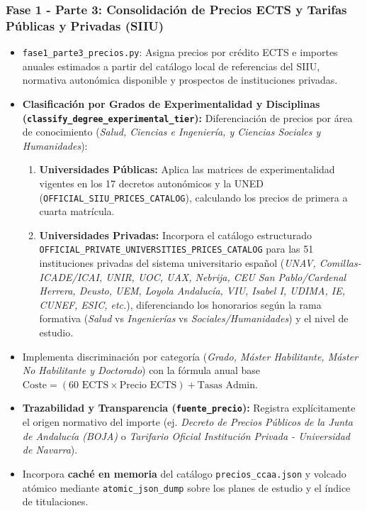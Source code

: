 \subsubsection{Fase 1 - Parte 3: Consolidación de Precios ECTS y Tarifas Públicas y Privadas (SIIU)}
\begin{itemize}
    \item \texttt{fase1\_parte3\_precios.py}: Asigna precios por crédito ECTS e importes anuales estimados a partir del catálogo local de referencias del SIIU, normativa autonómica disponible y prospectos de instituciones privadas.
    \item \textbf{Clasificación por Grados de Experimentalidad y Disciplinas (\texttt{classify\_degree\_experimental\_tier}):} Diferenciación de precios por área de conocimiento (\emph{Salud, Ciencias e Ingeniería, y Ciencias Sociales y Humanidades}):
    \begin{enumerate}
        \item \textbf{Universidades Públicas:} Aplica las matrices de experimentalidad vigentes en los 17 decretos autonómicos y la UNED (\texttt{OFFICIAL\_SIIU\_PRICES\_CATALOG}), calculando los precios de primera a cuarta matrícula.
        \item \textbf{Universidades Privadas:} Incorpora el catálogo estructurado \texttt{OFFICIAL\_PRIVATE\_UNIVERSITIES\_PRICES\_CATALOG} para las 51 instituciones privadas del sistema universitario español (\emph{UNAV, Comillas-ICADE/ICAI, UNIR, UOC, UAX, Nebrija, CEU San Pablo/Cardenal Herrera, Deusto, UEM, Loyola Andalucía, VIU, Isabel I, UDIMA, IE, CUNEF, ESIC, etc.}), diferenciando los honorarios según la rama formativa (\emph{Salud} vs \emph{Ingenierías} vs \emph{Sociales/Humanidades}) y el nivel de estudio.
    \end{enumerate}
    \item Implementa discriminación por categoría (\emph{Grado, Máster Habilitante, Máster No Habilitante y Doctorado}) con la fórmula anual base $\text{Coste} = (60 \text{ ECTS} \times \text{Precio ECTS}) + \text{Tasas Admin}$.
    \item \textbf{Trazabilidad y Transparencia (\texttt{fuente\_precio}):} Registra explícitamente el origen normativo del importe (ej. \emph{Decreto de Precios Públicos de la Junta de Andalucía (BOJA)} o \emph{Tarifario Oficial Institución Privada - Universidad de Navarra}).
    \item Incorpora \textbf{caché en memoria} del catálogo \texttt{precios\_ccaa.json} y volcado atómico mediante \texttt{atomic\_json\_dump} sobre los planes de estudio y el índice de titulaciones.
\end{itemize}



